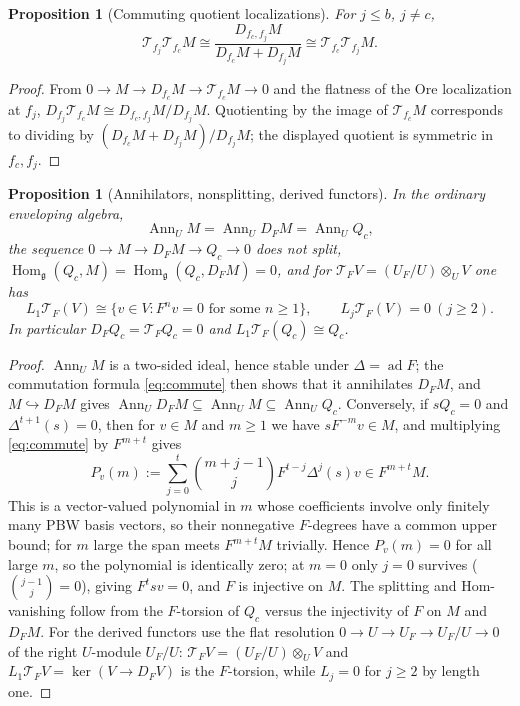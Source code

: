 \documentclass[11pt,a4paper]{article}
\newcommand{\g}{\mathfrak g}
\newcommand{\ad}{\operatorname{ad}}
\newcommand{\Ann}{\operatorname{Ann}}
\newcommand{\Hom}{\operatorname{Hom}}
\newcommand{\T}{\mathcal T}
\newtheorem{proposition}[theorem]{Proposition}
\begin{document}
\begin{proposition}[Commuting quotient localizations]
\label{prop:commuting}
For $j\le b$, $j\ne c$,
\[
 \T_{f_j}\T_{f_c}M\cong\frac{D_{f_c,f_j}M}{D_{f_c}M+D_{f_j}M}
 \cong\T_{f_c}\T_{f_j}M.
\]
\end{proposition}
\begin{proof}
From $0\to M\to D_{f_c}M\to\T_{f_c}M\to0$ and the flatness of the Ore
localization at $f_j$,
$D_{f_j}\T_{f_c}M\cong D_{f_c,f_j}M/D_{f_j}M$. Quotienting by the image of
$\T_{f_c}M$ corresponds to dividing by $(D_{f_c}M+D_{f_j}M)/D_{f_j}M$;
the displayed quotient is symmetric in $f_c,f_j$.
\end{proof}

\begin{proposition}[Annihilators, nonsplitting, derived functors]
\label{prop:ann}
In the ordinary enveloping algebra,
\[
 \Ann_UM=\Ann_UD_FM=\Ann_UQ_c,
\]
the sequence $0\to M\to D_FM\to Q_c\to0$ does not split,
$\Hom_\g(Q_c,M)=\Hom_\g(Q_c,D_FM)=0$, and for
$\T_FV=(U_F/U)\otimes_UV$ one has
\[
 L_1\T_F(V)\cong\{v\in V:F^nv=0\text{ for some }n\ge1\},\qquad
 L_j\T_F(V)=0\ (j\ge2).
\]
In particular $D_FQ_c=\T_FQ_c=0$ and $L_1\T_F(Q_c)\cong Q_c$.
\end{proposition}
\begin{proof}
$\Ann_UM$ is a two-sided ideal, hence stable under $\Delta=\ad F$; the
commutation formula \eqref{eq:commute} then shows that it annihilates
$D_FM$, and $M\hookrightarrow D_FM$ gives
$\Ann_UD_FM\subseteq\Ann_UM\subseteq\Ann_UQ_c$. Conversely, if
$sQ_c=0$ and $\Delta^{t+1}(s)=0$, then for $v\in M$ and $m\ge1$ we have
$sF^{-m}v\in M$, and multiplying \eqref{eq:commute} by $F^{m+t}$ gives
\[
 P_v(m):=\sum_{j=0}^{t}\binom{m+j-1}{j}F^{t-j}\Delta^j(s)v\in F^{m+t}M.
\]
This is a vector-valued polynomial in $m$ whose coefficients involve only
finitely many PBW basis vectors, so their nonnegative $F$-degrees have a
common upper bound; for $m$ large the span meets $F^{m+t}M$ trivially.
Hence $P_v(m)=0$ for all large $m$, so the polynomial is identically zero;
at $m=0$ only $j=0$ survives ($\binom{j-1}{j}=0$), giving $F^tsv=0$, and $F$
is injective on $M$. The splitting and Hom-vanishing follow from the
$F$-torsion of $Q_c$ versus the injectivity of $F$ on $M$ and $D_FM$. For
the derived functors use the flat resolution
$0\to U\to U_F\to U_F/U\to0$ of the right $U$-module $U_F/U$:
$\T_FV=(U_F/U)\otimes_UV$ and $L_1\T_FV=\ker(V\to D_FV)$ is the
$F$-torsion, while $L_j=0$ for $j\ge2$ by length one.
\end{proof}
\end{document}

